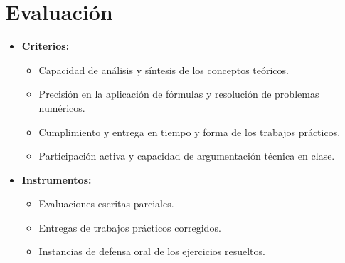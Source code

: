 \section*{Evaluación}
\begin{itemize}[label=\textbullet]
    \item \textbf{Criterios:}
    \begin{itemize}
        \item Capacidad de análisis y síntesis de los conceptos teóricos.
        \item Precisión en la aplicación de fórmulas y resolución de problemas numéricos.
        \item Cumplimiento y entrega en tiempo y forma de los trabajos prácticos.
        \item Participación activa y capacidad de argumentación técnica en clase.
    \end{itemize}
    \item \textbf{Instrumentos:}
    \begin{itemize}
        \item Evaluaciones escritas parciales.
        \item Entregas de trabajos prácticos corregidos.
        \item Instancias de defensa oral de los ejercicios resueltos.
    \end{itemize}
\end{itemize}